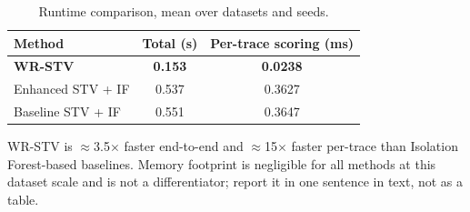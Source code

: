 \begin{table}[t]
\centering
\caption{Runtime comparison, mean over datasets and seeds.}
\label{tab:runtime}
\begin{tabular}{lcc}
\toprule
\textbf{Method} & \textbf{Total (s)} & \textbf{Per-trace scoring (ms)} \\
\midrule
\textbf{WR-STV}    & \textbf{0.153} & \textbf{0.0238} \\
Enhanced STV + IF  & 0.537 & 0.3627 \\
Baseline STV + IF  & 0.551 & 0.3647 \\
\bottomrule
\end{tabular}

\vspace{4pt}
\footnotesize
WR-STV is $\approx$3.5$\times$ faster end-to-end and $\approx$15$\times$
faster per-trace than Isolation Forest-based baselines. Memory footprint is
negligible for all methods at this dataset scale and is not a
differentiator; report it in one sentence in text, not as a table.
\end{table}
